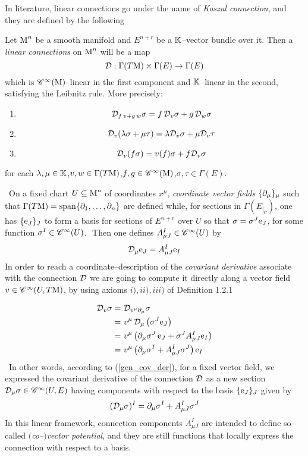 In literature, linear connections go under the name of \emph{Koszul connection}, and they are defined by the following

\begin{defi}
    Let $\text{\normalfont M}^n$ be a smooth manifold and $E^{n+r}$ be a $\mathbb{K}$--vector bundle over it. Then a \emph{linear connections} on $\text{\normalfont M}^n$ will be a map $$\mathcal{D}:\Gamma(T\text{\normalfont M})\times\Gamma(E)\to\Gamma(E)$$
    which is $\mathscr{C}^\infty(\text{\normalfont M})$--linear in the first component and $\mathbb{K}$--linear in the second, satisfying the Leibnitz rule. More precisely:
    \begin{enumerate}[i$)$]
        \item $$\mathcal{D}_{f\,v+g\,w}\sigma=f\,\mathcal{D}_v\sigma+g\,\mathcal{D}_w\sigma$$
        
        \item $$\mathcal{D}_v(\lambda\sigma+\mu\tau)=\lambda\mathcal{D}_v\sigma+\mu\mathcal{D}_v\tau$$
        
        \item $$\mathcal{D}_v(f\sigma)=v(f)\sigma+f\mathcal{D}_v\sigma$$
    \end{enumerate}
    for each \quad$\lambda,\mu\in\mathbb{K}$,\quad$v,w\in\Gamma(T\text{\normalfont M})$,\quad$f,g\in\mathscr{C}^\infty(\text{\normalfont M})$,\quad$\sigma,\tau\in\Gamma(E)$.
\end{defi}
\,\newline
On a fixed chart $U\subseteq\text{\normalfont M}^n$ of coordinates $x^\mu$, \emph{coordinate vector fields} $\{\partial_\mu\}_\mu$ such that $\Gamma(T\text{\normalfont M})=\operatorname{span}\{\partial_1,\hdots,\partial_n\}$ are defined while, for sections in $\Gamma(E_{|_U})$, one has $\{\text{\normalfont e}_J\}_J$ to form a basis for sections of $E^{n+r}$ over $U$ so that $\sigma=\sigma^J\text{\normalfont e}_J$, for some function $\sigma^I\in\mathscr{C}^\infty(U)$.\,\, Then one defines $ A^I_{\mu J}\in\mathscr{C}^\infty(U)$ by
$$\mathcal{D}_\mu\text{\normalfont e}_J= A^I_{\mu J}\text{\normalfont e}_I$$
In order to reach a coordinate--description of the \emph{covariant derivative} associate with the connection $\mathcal{D}$ we are going to compute it directly along a vector field $v\in\mathscr{C}^\infty(U,T\text{\normalfont M})$, by using axioms $i), ii), iii)$ of Definition 1.2.1

\begin{align*}
    \mathcal{D}_v\sigma = &\,\,\mathcal{D}_{v^\mu\partial_\mu}\sigma\\
        = &\,\,v^\mu\,\mathcal{D}_\mu\left(\sigma^J\text{\normalfont e}_J\right)\\
        = &\,\,v^\mu\left(\partial_\mu\sigma^J\,\text{\normalfont e}_J+\sigma^J A^I_{\mu J}\text{\normalfont e}_I\right)\\
        = &\,\,v^\mu\left(\partial_\mu\sigma^I+ A^I_{\mu J}\sigma^J\right)\text{\normalfont e}_I
\end{align*}
\,\newline
In other words, according to (\ref{gen_cov_der}), for a fixed vector field, we expressed the covariant derivative of the connection $\mathcal{D}$ as a new section $\mathcal{D}_\mu\sigma\in\mathscr{C}^\infty(U,E)$ having components with respect to the basis $\{\text{\normalfont e}_J\}_J$ given by
\begin{equation}\label{lin_cov_der}
    (\mathcal{D}_\mu\sigma)^I=\partial_\mu\sigma^I+ A^I_{\mu J}\sigma^J
\end{equation}
In this linear framework, connection components $A^I_{\mu J}$ are intended to define so--called \emph{$($co--$)$vector potential}, and they are still functions that locally express the connection with respect to a basis. 

